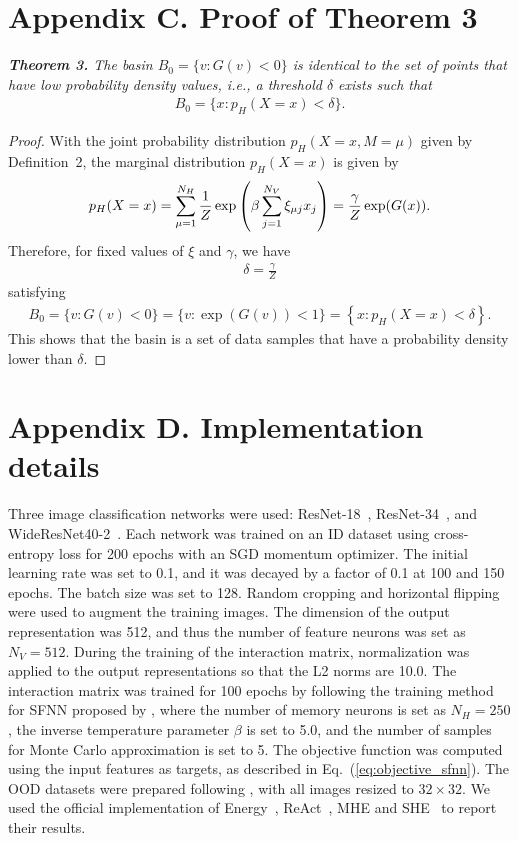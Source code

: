 \section*{Appendix C. Proof of Theorem 3}
\textit{\textbf{Theorem 3.}
The basin $B_{0} = \{ v : G(v) < 0\}$ is identical to the set of points that have low probability density values, {\it i.e.}, a threshold $\delta$ exists such that
\begin{align}
B_{0} = \{x : p_{H}(X = x) < \delta\}.
\end{align}
}
\begin{proof}
With the joint probability distribution $p_{H}(X=x, M=\mu)$ given by Definition~2, the marginal distribution $p_{H}(X=x)$ is given by
\begin{align}
p_{H}(X = x)
=
\sum_{\mu=1}^{N_{H}}
\frac{1}{Z} \exp \left(
{\beta \sum_{j=1}^{N_{V}} \xi_{\mu j} x_{j}}
\right)
=
\frac{\gamma}{Z} \exp(G(x)).
\end{align}
Therefore, for fixed values of $\xi$ and $\gamma$, we have
\begin{align}
\delta = \frac{\gamma}{Z}
\end{align}
satisfying
\begin{align}
B_{0}
= \{v: G(v) < 0\}
= \{v: \exp(G(v)) < 1\}
= \left\{x: p_{H}(X = x) < \delta \right\}.
\end{align}
This shows that the basin is a set of data samples that have a probability density lower than $\delta$.
\end{proof}

\section*{Appendix D. Implementation details}

Three image classification networks were used: ResNet-18~\cite{he2016resnet},
ResNet-34~\cite{he2016resnet}, and
WideResNet40-2~\cite{zagoruyko2016wide}.
Each network was trained on an ID dataset using cross-entropy loss for 200 epochs with an SGD momentum optimizer. The initial learning rate was set to 0.1, and it was decayed by a factor of 0.1 at 100 and 150 epochs. The batch size was set to 128. Random cropping and horizontal flipping were used to augment the training images.
The dimension of the output representation was 512, and thus the number of feature neurons was set as $N_{V} = 512$.
During the training of the interaction matrix, normalization was applied to the output representations so that the L2 norms are 10.0.
The interaction matrix was trained for 100 epochs by following the training method for SFNN proposed by \citet{tang13sfnn}, where the number of memory neurons is set as $N_{H} = 250$, the inverse temperature parameter $\beta$ is set to 5.0, and the number of samples for Monte Carlo approximation is set to 5.
The objective function was computed using the input features as targets, as described in Eq.~(\ref{eq:objective_sfnn}). The OOD datasets were prepared following \citet{shen2023posthoc}, with all images resized to $32 \times 32$. We used the official implementation of Energy~\cite{liu2020energy}, ReAct~\cite{sun2021react}, MHE and SHE~\cite{shen2023posthoc} to report their results.

